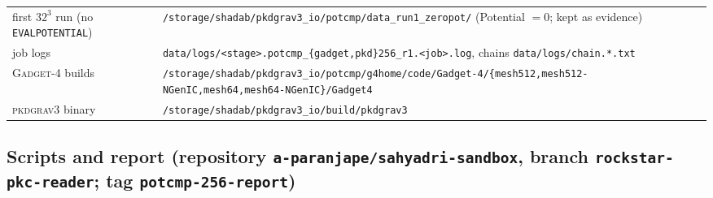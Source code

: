 \documentclass[11pt,a4paper]{article}
\newcommand{\pkd}{\textsc{pkdgrav3}}
\newcommand{\gad}{\textsc{Gadget-4}}
\newcommand{\fp}[1]{\nolinkurl{#1}}
\begin{document}
\begin{center}
\begin{tabular}{@{}L{0.24\textwidth}L{0.73\textwidth}@{}}
first $32^3$ run (no \texttt{EVALPOTENTIAL}) & \fp{/storage/shadab/pkdgrav3_io/potcmp/data_run1_zeropot/} (Potential $=0$; kept as evidence) \\
job logs & \fp{data/logs/<stage>.potcmp_{gadget,pkd}256_r1.<job>.log}, chains \fp{data/logs/chain.*.txt} \\
\gad{} builds & \fp{/storage/shadab/pkdgrav3_io/potcmp/g4home/code/Gadget-4/{mesh512,mesh512-NGenIC,mesh64,mesh64-NGenIC}/Gadget4} \\
\pkd{} binary & \fp{/storage/shadab/pkdgrav3_io/build/pkdgrav3} \\
\bottomrule
\end{tabular}
\end{center}

\subsection*{Scripts and report (repository \fp{a-paranjape/sahyadri-sandbox}, branch \fp{rockstar-pkc-reader}; tag \fp{potcmp-256-report})}
\end{document}
